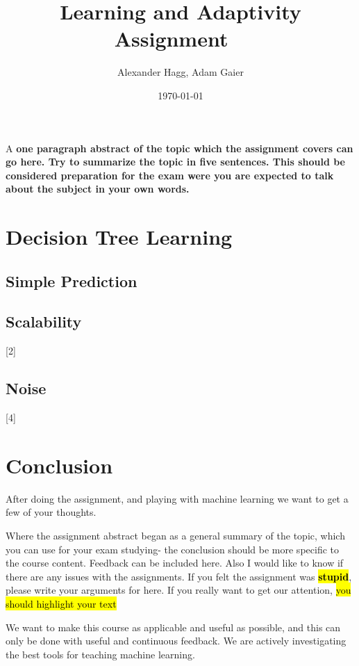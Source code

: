 \documentclass[	DIV=calc,%
				paper=a4,%
				fontsize=11pt,%
				twocolumn]{scrartcl}	 %
\title{Learning and Adaptivity
\\ Assignment ~\upperRomannumeral{1}}%
\author{Alexander Hagg, Adam Gaier }	%
\date{\today}
\newcommand{\initial}[1]{%
     \lettrine[lines=3,lhang=0.3,nindent=0em]{
     				\color{brsublue}
     				{\textsf{#1}}}{}}
\begin{document}
\maketitle
\thispagestyle{fancy} %
\initial{A}\textbf{ one paragraph abstract of the topic which the assignment covers can go here. Try to summarize the topic in five sentences. This should be considered preparation for the exam were you are expected to talk about the subject in your own words.}


\setcounter{section}{5}
\section{Decision Tree Learning}
\subsection{Simple Prediction}

\blindenumerate[4]

\subsection{Scalability}

[2]

\subsection{Noise}

[4]

\vfill

\section*{Conclusion}

After doing the assignment, and playing with machine learning we want to get a few of your thoughts. 

Where the assignment abstract began as a general summary of the topic, which you can use for your exam studying- the conclusion should be more specific to the course content. Feedback can be included here. Also I would like to know if there are any issues with the assignments. If you felt the assignment was \textbf{\hl{stupid}}, please write your arguments for here.  If you really want to get our attention, \hl{you should highlight your text} 

We want to make this course as applicable and useful as possible, and this can only be done with useful and continuous feedback. We are actively investigating the best tools for teaching machine learning. 
\end{document}
